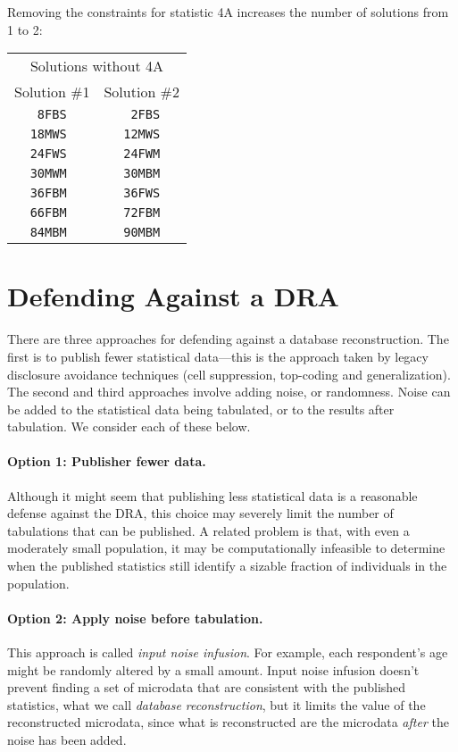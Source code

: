 \documentclass[runningheads]{llncs}
\begin{document}
Removing the constraints for statistic 4A increases the number of
solutions from 1 to 2:

\begin{center}
\begin{tabular}{c|c}
\multicolumn{2}{c}{Solutions without 4A}\\
  Solution \#1 & Solution \#2 \\
\hline
 \texttt{ 8FBS } &  \texttt{ 2FBS} \\
 \texttt{18MWS } &  \texttt{12MWS} \\
 \texttt{24FWS } &  \texttt{24FWM} \\
 \texttt{30MWM } &  \texttt{30MBM} \\
 \texttt{36FBM } &  \texttt{36FWS} \\
 \texttt{66FBM } &  \texttt{72FBM} \\
 \texttt{84MBM } &  \texttt{90MBM} \\
  \end{tabular}
\end{center}


\section{Defending Against a DRA}\label{solution}
There are three approaches for defending against a database
reconstruction. The first is to publish fewer statistical data---this
is the approach taken by legacy disclosure avoidance techniques (cell
suppression, top-coding and generalization). The second and third
approaches involve adding noise, or randomness. Noise can be added to
the statistical data being tabulated, or to the results after
tabulation. We consider each of these below.

\paragraph{Option 1: Publisher fewer data.} Although it might seem that publishing less statistical data is a
reasonable defense against the DRA, this choice may severely limit the
number of tabulations that can be published. A related problem is
that, with even a moderately small population, it may be
computationally infeasible to determine when the published statistics
still identify a sizable fraction of individuals in the population. 

\paragraph{Option 2: Apply noise before tabulation.} This approach is called \emph{input noise infusion}. For example, each respondent's age might be randomly
altered by a small amount. Input noise infusion doesn't prevent
finding a set of microdata that are consistent with the published
statistics, what we call \emph{database reconstruction}, but it limits
the value of the reconstructed microdata, since what is reconstructed
are the microdata \emph{after} the noise has been added.
\end{document}
